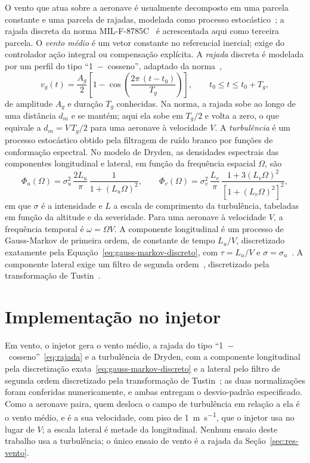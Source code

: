 O vento que atua sobre a aeronave é usualmente decomposto em uma parcela
constante e uma parcela de rajadas, modelada como processo
estocástico~\cite{beard2012}; a rajada discreta da norma
MIL-F-8785C~\cite{mil8785c} é acrescentada aqui como terceira parcela. O
\emph{vento médio} é um vetor constante no referencial inercial; exige do
controlador ação integral ou compensação explícita. A \emph{rajada} discreta
é modelada por um perfil do tipo ``1~$-$~cosseno'', adaptado da
norma~\cite{mil8785c},
\begin{equation}
v_g(t) = \frac{A_g}{2}\left[1 - \cos\left(\frac{2\pi\,(t - t_0)}{T_g}\right)\right],
\qquad t_0 \le t \le t_0 + T_g,
\label{eq:rajada}
\end{equation}
de amplitude $A_g$ e duração $T_g$ conhecidas. Na norma, a rajada sobe ao
longo de uma distância $d_m$ e se mantém; aqui ela sobe em $T_g/2$ e volta a
zero, o que equivale a $d_m = V\,T_g/2$ para uma aeronave à velocidade $V$.
A \emph{turbulência} é um
processo estocástico obtido pela filtragem de ruído branco por funções de
conformação espectral. No modelo de Dryden, as densidades espectrais das
componentes longitudinal e lateral, em função da frequência espacial
$\Omega$, são~\cite[seção~3.7.1.2]{mil8785c}
\begin{equation}
\Phi_u(\Omega) = \sigma_u^2\,\frac{2L_u}{\pi}\,\frac{1}{1 + (L_u\Omega)^2},
\qquad
\Phi_v(\Omega) = \sigma_v^2\,\frac{L_v}{\pi}\,
\frac{1 + 3(L_v\Omega)^2}{\left[1 + (L_v\Omega)^2\right]^2},
\label{eq:dryden}
\end{equation}
em que $\sigma$ é a intensidade e $L$ a escala de comprimento da turbulência,
tabeladas em função da altitude e da severidade. Para uma aeronave à
velocidade $V$, a frequência temporal é $\omega = \Omega V$. A componente
longitudinal é um processo de Gauss-Markov de primeira ordem, de constante de
tempo $L_u/V$, discretizado exatamente pela
Equação~\eqref{eq:gauss-markov-discreto}, com $\tau = L_u/V$ e
$\sigma = \sigma_u$~\cite{gillespie1996}. A
componente lateral exige um filtro de segunda ordem~\cite{beard2012},
discretizado pela transformação de Tustin~\cite{tustin1947}.

\section{Implementação no injetor}
\label{ap:vento-injetor}

Em vento, o injetor gera o vento médio, a rajada do tipo
``1~$-$~cosseno''~\eqref{eq:rajada} e a turbulência de Dryden, com a
componente longitudinal pela discretização
exata~\eqref{eq:gauss-markov-discreto} e a lateral pelo filtro de segunda
ordem discretizado pela transformação de Tustin~\cite{tustin1947,franklin1998};
as duas normalizações foram conferidas numericamente, e ambas entregam o
desvio-padrão especificado. Como a aeronave paira, quem desloca o campo de
turbulência em relação a ela é o vento médio, e é a sua velocidade, com piso
de \SI{1}{\metre\per\second}, que o injetor usa no lugar de $V$; a escala
lateral é metade da longitudinal. Nenhum ensaio deste trabalho usa a
turbulência; o único ensaio de vento é a rajada da Seção~\ref{sec:res-vento}.

